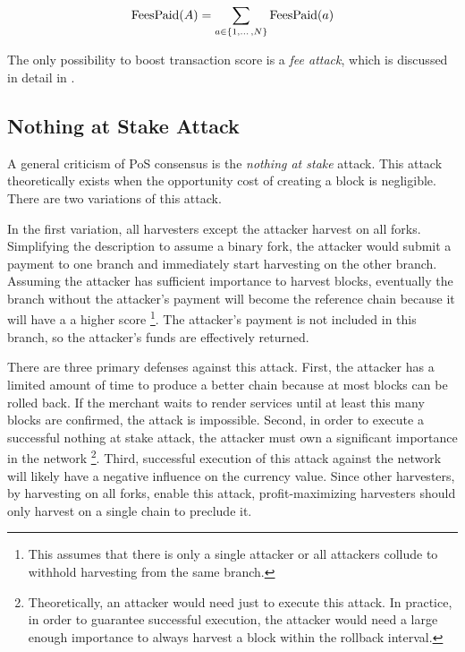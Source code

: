 \begin{equation}
\mathrm{FeesPaid}(A) = \sum\limits_{a \in \{1, \dotso, N\}} \mathrm{FeesPaid}(a)
\end{equation}

The only possibility to boost transaction score is a \emph{fee attack}, which is discussed in detail in .

\subsection{Nothing at Stake Attack}

A general criticism of PoS consensus is the \emph{nothing at stake} attack.
This attack theoretically exists when the opportunity cost of creating a block is negligible.
There are two variations of this attack.

In the first variation, all harvesters except the attacker harvest on all forks.
Simplifying the description to assume a binary fork, the attacker would submit a payment to one branch and immediately start harvesting on the other branch.
Assuming the attacker has sufficient importance to harvest blocks, eventually the branch without the attacker's payment will become the reference chain because it will have a a higher score
\footnote{This assumes that there is only a single attacker or all attackers collude to withhold harvesting from the same branch.}.
The attacker's payment is not included in this branch, so the attacker's funds are effectively returned.

There are three primary defenses against this attack.
First, the attacker has a limited amount of time to produce a better chain because at most  blocks can be rolled back.
If the merchant waits to render services until at least this many blocks are confirmed, the attack is impossible.
Second, in order to execute a successful nothing at stake attack, the attacker must own a significant importance in the network
\footnote{
	Theoretically, an attacker would need just  to execute this attack.
	In practice, in order to guarantee successful execution, the attacker would need a large enough importance to always harvest a block within the rollback interval.
}.
Third, successful execution of this attack against the network will likely have a negative influence on the currency value.
Since other harvesters, by harvesting on all forks, enable this attack, profit-maximizing harvesters should only harvest on a single chain to preclude it.

